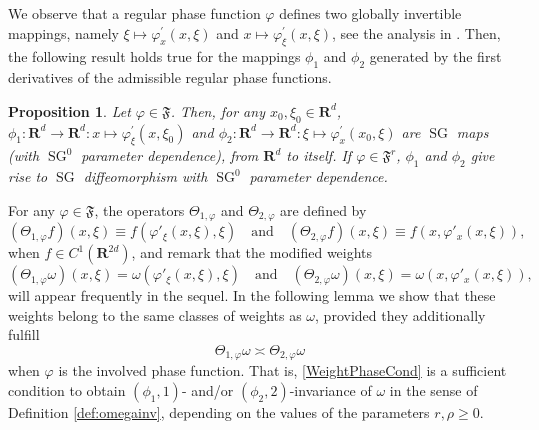 \documentclass[12pt,a4paper,reqno]{amsart}
\numberwithin{equation}{section}
\numberwithin{thm}{section}
\newtheorem{prop}[thm]{Proposition}
\theoremstyle{definition}
\theoremstyle{remark}
\begin{document}
\par

We observe that a regular phase function $\varphi$
defines two globally invertible mappings,
namely $\xi \mapsto  \varphi^\prime_x(x,\xi)$ and $x \mapsto  \varphi
^\prime_\xi (x,\xi)$, see the analysis in \cite{coriasco}. 
Then, the following result holds true for the mappings $\phi_1$ and $\phi_2$
generated by the first derivatives of the admissible regular phase functions.

\par

\begin{prop}
\label{prop:3.2}
Let $\varphi \in {\mathfrak{F}}$. Then, for any $x_0,\xi _0\in {\mathbf R^{d}}$,
$\phi_1\colon{\mathbf R^{{d}}}\to{\mathbf R^{{d}}}\colon x \mapsto  \varphi^\prime_\xi (x,\xi _0)$ and
$\phi_2\colon{\mathbf R^{{d}}}\to{\mathbf R^{{d}}}\colon \xi \mapsto  \varphi^\prime_x(x_0,\xi)$ 
are ${\operatorname{SG}}$ maps (with ${\operatorname{SG}}^0$ parameter dependence), from ${\mathbf R^{{d}}}$ to itself. 
If $\varphi\in{\mathfrak{F}^r}$, $\phi_1$ and $\phi_2$ give rise to ${\operatorname{SG}}$ diffeomorphism 
with ${\operatorname{SG}}^{0}$ parameter dependence.
\end{prop}

\par

For any $\varphi \in {\mathfrak{F}}$, the operators $\Theta _{1,{\varphi}}$ and $\Theta _{2,{\varphi}}$
are defined by
$$
(\Theta _{1,{\varphi}}f)(x,\xi ) \equiv f({\varphi} '_\xi (x,\xi ), \xi)
\quad \text{and}\quad
(\Theta _{2,{\varphi}}f)(x,\xi ) \equiv f(x, {\varphi} '_x(x,\xi )),
$$
when $f\in C^1({\mathbf R^{{2d}}})$, and remark that
the modified weights
\begin{equation}\label{omegaVarphiDef}
(\Theta _{1,{\varphi}}\omega )  (x,\xi ) = \omega ({\varphi} '_\xi (x,\xi ), \xi)
\quad \text{and}\quad
(\Theta _{2,{\varphi}}\omega ) (x,\xi ) = \omega (x, {\varphi} '_x(x,\xi )), 
\end{equation}
will appear frequently in the sequel. In the following lemma we
show that these weights belong to the same classes of weights
as $\omega$, provided they additionally fulfill
\begin{equation}\label{WeightPhaseCond}
\Theta _{1,{\varphi}}\omega  \asymp \Theta _{2,{\varphi}}\omega 
\end{equation}
when ${\varphi}$ is the involved phase function. That is,
\eqref{WeightPhaseCond} is a sufficient condition to obtain
$(\phi_1,1)$- and/or $(\phi_2,2)$-invariance of $\omega$
in the sense of Definition \ref{def:omegainv}, depending on the values of
the parameters $r,\rho\ge0$.
\end{document}
